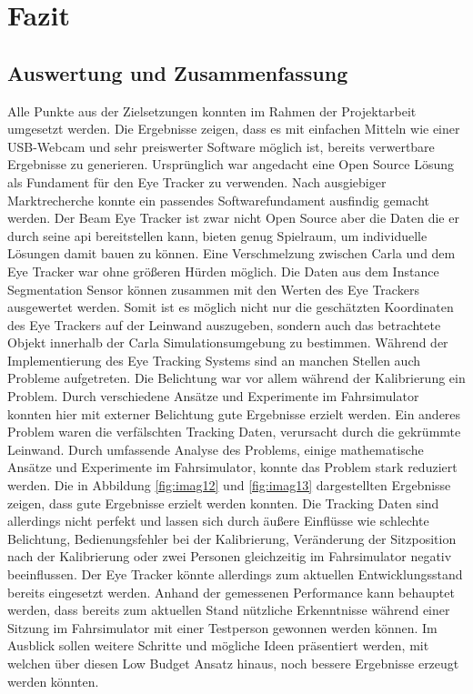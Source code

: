 \chapter{Fazit}
\label{sec:fazit}

\section{Auswertung und Zusammenfassung}

Alle Punkte aus der Zielsetzungen konnten im Rahmen der Projektarbeit umgesetzt werden. Die Ergebnisse zeigen, dass es mit einfachen Mitteln wie einer USB-Webcam und sehr preiswerter Software möglich ist, bereits verwertbare Ergebnisse zu generieren. Ursprünglich war angedacht eine Open Source Lösung als Fundament für den Eye Tracker zu verwenden. Nach ausgiebiger Marktrecherche konnte ein passendes Softwarefundament ausfindig gemacht werden. Der Beam Eye Tracker ist zwar nicht Open Source aber die Daten die er durch seine \acrshort{api} bereitstellen kann, bieten genug Spielraum, um individuelle Lösungen damit bauen zu können. Eine Verschmelzung zwischen Carla und dem Eye Tracker war ohne größeren Hürden möglich. Die Daten aus dem Instance Segmentation Sensor können zusammen mit den Werten des Eye Trackers ausgewertet werden. Somit ist es möglich nicht nur die geschätzten Koordinaten des Eye Trackers auf der Leinwand auszugeben, sondern auch das betrachtete Objekt innerhalb der Carla Simulationsumgebung zu bestimmen.
Während der Implementierung des Eye Tracking Systems sind an manchen Stellen auch Probleme aufgetreten. Die Belichtung war vor allem während der Kalibrierung ein Problem. Durch verschiedene Ansätze und Experimente im Fahrsimulator konnten hier mit externer Belichtung gute Ergebnisse erzielt werden.
Ein anderes Problem waren die verfälschten Tracking Daten, verursacht durch die gekrümmte Leinwand. Durch umfassende Analyse des Problems, einige mathematische Ansätze und Experimente im Fahrsimulator, konnte das Problem stark reduziert werden. Die in Abbildung \ref{fig:imag12} und \ref{fig:imag13} dargestellten Ergebnisse zeigen, dass gute Ergebnisse erzielt werden konnten. 
Die Tracking Daten sind allerdings nicht perfekt und lassen sich durch äußere Einflüsse wie schlechte Belichtung, Bedienungsfehler bei der Kalibrierung, Veränderung der Sitzposition nach der Kalibrierung oder zwei Personen gleichzeitig im Fahrsimulator negativ beeinflussen. Der Eye Tracker könnte allerdings zum aktuellen Entwicklungsstand bereits eingesetzt werden. Anhand der gemessenen Performance kann behauptet werden, dass bereits zum aktuellen Stand nützliche Erkenntnisse während einer Sitzung im Fahrsimulator mit einer Testperson gewonnen werden können. Im Ausblick sollen weitere Schritte und mögliche Ideen präsentiert werden, mit welchen über diesen Low Budget Ansatz hinaus, noch bessere Ergebnisse erzeugt werden könnten.


